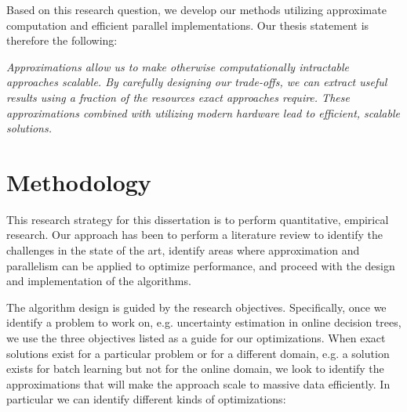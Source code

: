 \noindent
Based on this research question, we develop our methods utilizing approximate computation and efficient parallel implementations. Our thesis statement is therefore the following:

\begin{displayquote}
	\emph{Approximations allow us to make otherwise computationally intractable approaches scalable.
	By carefully designing our trade-offs, we can extract useful results using a fraction
	of the resources exact approaches require. These approximations combined with utilizing modern hardware lead to efficient, scalable solutions.}
\end{displayquote}



\section{Methodology}

This research strategy for this dissertation is to perform quantitative, empirical research.
Our approach has been to perform a literature review to identify the challenges in the
state of the art, identify areas where approximation and parallelism can be applied to
optimize performance, and proceed with the design and implementation of the algorithms.

The algorithm design is guided by the research objectives. Specifically, once we identify a problem
to work on, e.g. uncertainty estimation in online decision trees, we use the three objectives
listed as a guide for our optimizations. When exact solutions exist for a particular problem
or for a different domain, e.g. a solution exists for batch learning but not for the online
domain, we look to identify the approximations that will make the approach scale to massive
data efficiently. In particular we can identify different kinds of optimizations:

